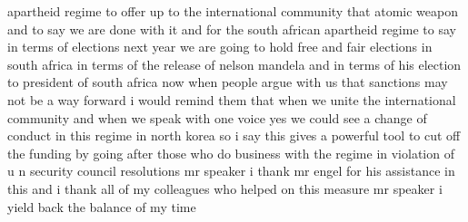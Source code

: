 \documentclass{article}
\begin{document}
apartheid regime to offer up to the international community that atomic weapon and to say we are done with it and for the south african apartheid regime to say in terms of elections next year we are going to hold free and fair elections in south africa in terms of the release of nelson mandela and in terms of his election to president of south africa now when people argue with us that sanctions may not be a way forward i would remind them that when we unite the international community and when we speak with one voice yes we could see a change of conduct in this regime in north korea so i say this gives a powerful tool to cut off the funding by going after those who do business with the regime in violation of u n security council resolutions mr speaker i thank mr engel for his assistance in this and i thank all of my colleagues who helped on this measure mr speaker i yield back the balance of my time\pagebreak
\end{document}
